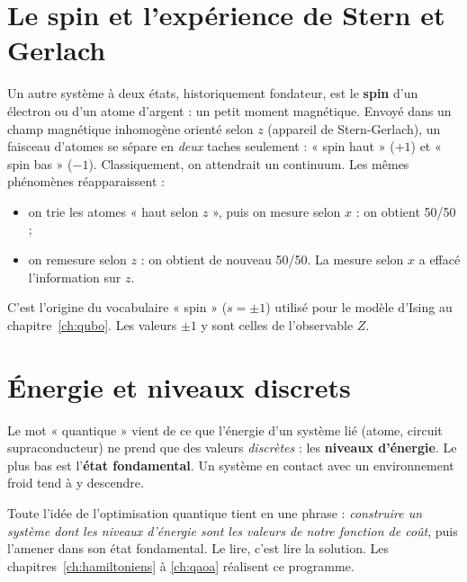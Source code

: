 \section{Le spin et l'expérience de Stern et Gerlach}
Un autre système à deux états, historiquement fondateur, est le \textbf{spin} d'un électron ou d'un atome d'argent : un petit moment magnétique. Envoyé dans un champ magnétique inhomogène orienté selon $z$ (appareil de Stern-Gerlach), un faisceau d'atomes se sépare en \emph{deux} taches seulement : « spin haut » ($+1$) et « spin bas » ($-1$). Classiquement, on attendrait un continuum. Les mêmes phénomènes réapparaissent :
\begin{itemize}
\item on trie les atomes « haut selon $z$ », puis on mesure selon $x$ : on obtient 50/50 ;
\item on remesure selon $z$ : on obtient de nouveau 50/50. La mesure selon $x$ a effacé l'information sur $z$.
\end{itemize}
C'est l'origine du vocabulaire « spin » ($s=\pm1$) utilisé pour le modèle d'Ising au chapitre~\ref{ch:qubo}. Les valeurs $\pm1$ y sont celles de l'observable $Z$.

\section{Énergie et niveaux discrets}
Le mot « quantique » vient de ce que l'énergie d'un système lié (atome, circuit supraconducteur) ne prend que des valeurs \emph{discrètes} : les \textbf{niveaux d'énergie}. Le plus bas est l'\textbf{état fondamental}. Un système en contact avec un environnement froid tend à y descendre.
\begin{resultat}
Toute l'idée de l'optimisation quantique tient en une phrase : \emph{construire un système dont les niveaux d'énergie sont les valeurs de notre fonction de coût}, puis l'amener dans son état fondamental. Le lire, c'est lire la solution. Les chapitres~\ref{ch:hamiltoniens} à \ref{ch:qaoa} réalisent ce programme.
\end{resultat}

